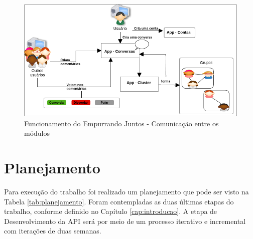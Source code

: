 \begin{figure}[bt!]
\centering
\includegraphics[scale=0.6]{figuras/resumo_ej_api.png}
\caption{Funcionamento do Empurrando Juntos - Comunicação entre os módulos}
\label{fig:resumo_ej_api}
\end{figure}

\vfill
\pagebreak

\section{Planejamento}

Para execução do trabalho foi realizado um planejamento que pode ser visto na Tabela \ref{tab:planejamento}.
Foram contempladas as duas últimas etapas do trabalho, conforme definido no Capítulo \ref{cap:introducao}.
A etapa de Desenvolvimento da API será por meio de um processo iterativo e incremental com iterações de duas semanas. 

